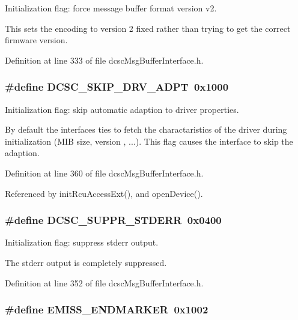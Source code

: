 Initialization flag: force message buffer format version v2. 

This sets the encoding to version 2 fixed rather than trying to get the correct firmware version. 

Definition at line 333 of file dcsc\-Msg\-Buffer\-Interface.h.\hypertarget{group__dcsc__msg__buffer__access_g1d0799f8bf0c0b77db6155e5d78a4619}{
\subsubsection[DCSC\_\-SKIP\_\-DRV\_\-ADPT]{\setlength{\rightskip}{0pt plus 5cm}\#define DCSC\_\-SKIP\_\-DRV\_\-ADPT~0x1000}}
\label{group__dcsc__msg__buffer__access_g1d0799f8bf0c0b77db6155e5d78a4619}


Initialization flag: skip automatic adaption to driver properties. 

By default the interfaces ties to fetch the charactaristics of the driver during initialization (MIB size, version , ...). This flag causes the interface to skip the adaption. 

Definition at line 360 of file dcsc\-Msg\-Buffer\-Interface.h.

Referenced by init\-Rcu\-Access\-Ext(), and open\-Device().\hypertarget{group__dcsc__msg__buffer__access_g3a969c22c4b8fc27c201023112f70bb7}{
\subsubsection[DCSC\_\-SUPPR\_\-STDERR]{\setlength{\rightskip}{0pt plus 5cm}\#define DCSC\_\-SUPPR\_\-STDERR~0x0400}}
\label{group__dcsc__msg__buffer__access_g3a969c22c4b8fc27c201023112f70bb7}


Initialization flag: suppress stderr output. 

The stderr output is completely suppressed. 

Definition at line 352 of file dcsc\-Msg\-Buffer\-Interface.h.\hypertarget{group__dcsc__msg__buffer__access_g0003c432c9b704625105bb7fda5e875e}{
\subsubsection[EMISS\_\-ENDMARKER]{\setlength{\rightskip}{0pt plus 5cm}\#define EMISS\_\-ENDMARKER~0x1002}}
\label{group__dcsc__msg__buffer__access_g0003c432c9b704625105bb7fda5e875e}



